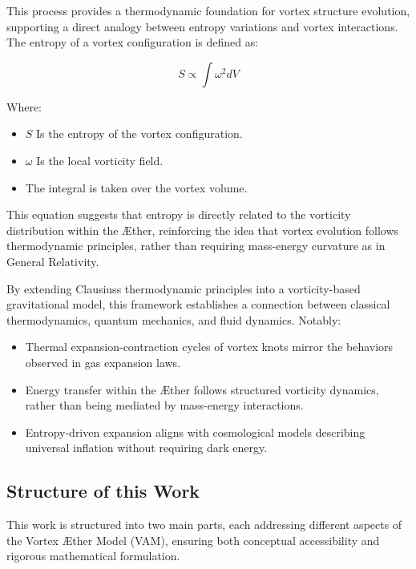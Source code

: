 This process provides a thermodynamic foundation for vortex structure evolution, supporting a direct analogy between entropy variations and vortex interactions.
The entropy of a vortex configuration is defined as:

\begin{equation*} \label{eq:Entropy}
S \propto \int \omega^2 dV
\end{equation*}

Where:

\begin{itemize}
    \item \( S \) Is the entropy of the vortex configuration.
    \item \( \omega \)  Is the local vorticity field.
    \item The integral is taken over the vortex volume.
\end{itemize}

This equation suggests that entropy is directly related to the vorticity distribution within the Æther, reinforcing the idea that vortex evolution follows thermodynamic principles, rather than requiring mass-energy curvature as in General Relativity.

By extending Clausius\rqs s thermodynamic principles into a vorticity-based gravitational model, this framework establishes a connection between classical thermodynamics, quantum mechanics, and fluid dynamics. Notably:

\begin{itemize}
    \item Thermal expansion-contraction cycles of vortex knots mirror the behaviors observed in gas expansion laws.
    \item Energy transfer within the Æther follows structured vorticity dynamics, rather than being mediated by mass-energy interactions.
    \item Entropy-driven expansion aligns with cosmological models describing universal inflation without requiring dark energy.
\end{itemize}

\subsection*{Structure of this Work}

This work is structured into two main parts, each addressing different aspects of the Vortex Æther Model (VAM), ensuring both conceptual accessibility and rigorous mathematical formulation.

